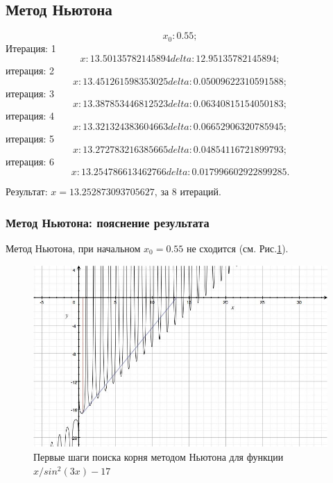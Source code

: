 \documentclass{article}
\begin{document}
\subsection{Метод Ньютона}
\begin{displaymath}
  x_{0}: 0.55;
\end{displaymath}
Итерация: 1
\begin{displaymath}
  x: 13.50135782145894  delta: 12.95135782145894;
\end{displaymath}
итерация: 2
\begin{displaymath}
  x: 13.451261598353025  delta: 0.05009622310591588;
\end{displaymath}
итерация: 3
\begin{displaymath}
  x: 13.387853446812523  delta: 0.06340815154050183;
\end{displaymath}
итерация: 4
\begin{displaymath}
  x: 13.321324383604663  delta: 0.06652906320785945;
\end{displaymath}
итерация: 5
\begin{displaymath}
  x: 13.272783216385665  delta: 0.04854116721899793;
\end{displaymath}
итерация: 6
\begin{displaymath}
  x: 13.254786613462766  delta: 0.017996602922899285.
\end{displaymath}

Результат: $x = 13.252873093705627$, за 8 итераций.
\subsubsection{Метод Ньютона: пояснение результата}
  Метод Ньютона, при начальном $x_{0} = 0.55$ не сходится (см.
  Рис.\ref{equ_newton_img}).
  \begin{figure}[b]
    \includegraphics[width=13cm]{equations_newton.png}
    \caption{Первые шаги поиска корня методом Ньютона для функции $x/sin^2(3x)
    - 17$}
    \label{equ_newton_img}
  \end{figure}
\end{document}
